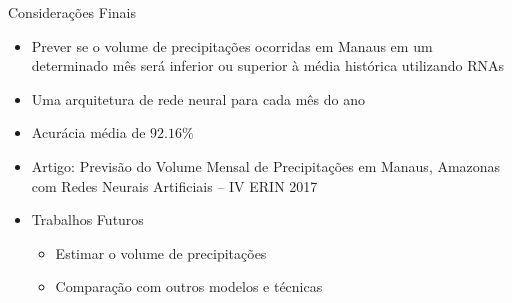 \begin{frame}{Considerações Finais}
	\begin{itemize}
		\item Prever se o volume de precipitações ocorridas em Manaus em um determinado mês será inferior ou superior à média histórica utilizando RNAs\\
		\item Uma arquitetura de rede neural para cada mês do ano
		\item Acurácia média de $92.16\%$
		\item Artigo: Previsão do Volume Mensal de Precipitações em Manaus, Amazonas com Redes Neurais Artificiais -- IV ERIN 2017
		\\
		\item Trabalhos Futuros
		\begin{itemize}
			\item Estimar o volume de precipitações
			\item Comparação com outros modelos e técnicas
		\end{itemize}
  \end{itemize}
\end{frame}

